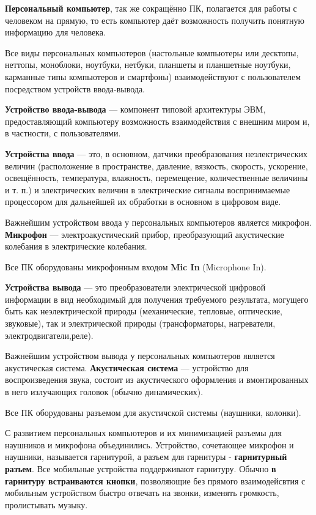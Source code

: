 \Introduction

\textbf{Персональный компьютер}, так же сокращённо ПК, полагается для работы с человеком на прямую, то есть компьютер даёт возможность получить понятную информацию для человека. \cite{procomputer-pc}

Все виды персональных компьютеров (настольные компьютеры или десктопы, неттопы, моноблоки, ноутбуки, нетбуки, планшеты и планшетные ноутбуки, карманные типы компьютеров и смартфоны) взаимодействуют с пользователем посредством устройств ввода-вывода. 

\textbf{Устройство ввода-вывода} — компонент типовой архитектуры ЭВМ, предоставляющий компьютеру возможность взаимодействия с внешним миром и, в частности, с пользователями.

\textbf{Устройства ввода} — это, в основном, датчики преобразования неэлектрических величин (расположение в пространстве, давление, вязкость, скорость, ускорение, освещённость, температура, влажность, перемещение, количественные величины и т. п.) и электрических величин в электрические сигналы воспринимаемые процессором для дальнейшей их обработки в основном в цифровом виде. \cite{wiki-io}

Важнейшим устройством ввода у персональных компьютеров является микрофон.
\textbf{Микрофон} — электроакустический прибор, преобразующий акустические колебания в элект­рические коле­бания. \cite{wiki-microphone}

Все ПК оборудованы микрофонным входом \textbf{Mic In} (Microphone In).

\textbf{Устройства вывода} — это преобразователи электрической цифровой информации в вид необходимый для получения требуемого результата, могущего быть как неэлектрической природы (механические, тепловые, оптические, звуковые), так и электрической природы (трансформаторы, нагреватели, электродвигатели,реле). \cite{wiki-io}

Важнейшим устройством вывода у персональных компьютеров является акустическая система.
\textbf{Акустическая система} — устройство для воспроизведения звука, состоит из акустического оформления и вмонтированных в него излучающих головок (обычно динамических). \cite{wiki-loudspeaker_enclosure}

Все ПК оборудованы разъемом для акустичской системы (наушники, колонки).

С развитием персональных компьютеров и их минимизацией разъемы для наушников и микрофона объединились. Устройство, сочетающее микрофон и наушники, называется гарнитурой, а разъем для гарнитуры - \textbf{гарнитурный разъем}. Все мобильные устройства поддерживают гарнитуру. Обычно \textbf{в гарнитуру встраиваются кнопки}, позволяющие без прямого взаимодейсвтия с мобильным устройством быстро отвечать на звонки, изменять громкость, пролистывать музыку. 

